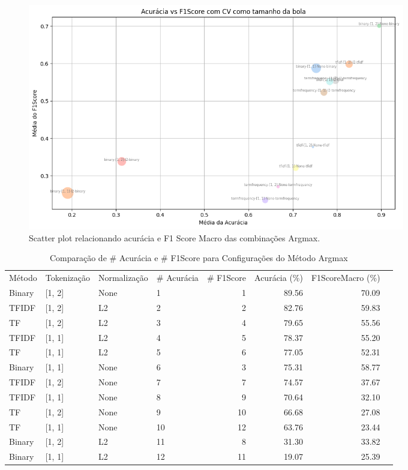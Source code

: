 \begin{figure}[H]
    \centering
    \includegraphics[width=0.8\textwidth]{images/ArgmaxScatterTodos.png}
    \caption{Scatter plot relacionando acurácia e F1 Score Macro das combinações Argmax.}
    \label{fig:scatter_acuracia_f1score}
\end{figure}

\begin{table}[H]
\centering
\caption{Comparação de \# Acurácia e \# F1Score para Configurações do Método Argmax}
\label{tab:resultadocomparativo}
\footnotesize %
\begin{tabular}{llllrrrr}

Método & Tokenização & Normalização &  \# Acurácia &  \# F1Score &  Acurácia (\%) &  F1ScoreMacro (\%) \\

Binary & [1, 2] & None &  1 & 1 & 89.56 & 70.09 \\
TFIDF & [1, 2] & L2 & 2 & 2 & 82.76 & 59.83 \\
TF & [1, 2] & L2 & 3 & 4 & 79.65 & 55.56 \\
TFIDF & [1, 1] & L2 & 4 & 5 & 78.37 & 55.20 \\
TF & [1, 1] & L2 & 5 & 6 & 77.05 & 52.31 \\
Binary & [1, 1] & None & 6 & 3 & 75.31 & 58.77 \\
TFIDF & [1, 2] & None & 7 & 7 & 74.57 & 37.67 \\
TFIDF & [1, 1] & None & 8 & 9 & 70.64 & 32.10 \\
TF & [1, 2] & None & 9 & 10 & 66.68 & 27.08 \\
TF & [1, 1] & None & 10 & 12 & 63.76 & 23.44 \\
Binary & [1, 2] & L2 & 11 & 8 & 31.30 & 33.82 \\
Binary & [1, 1] & L2 & 12 & 11 & 19.07 & 25.39 \\

\end{tabular}
\end{table}

